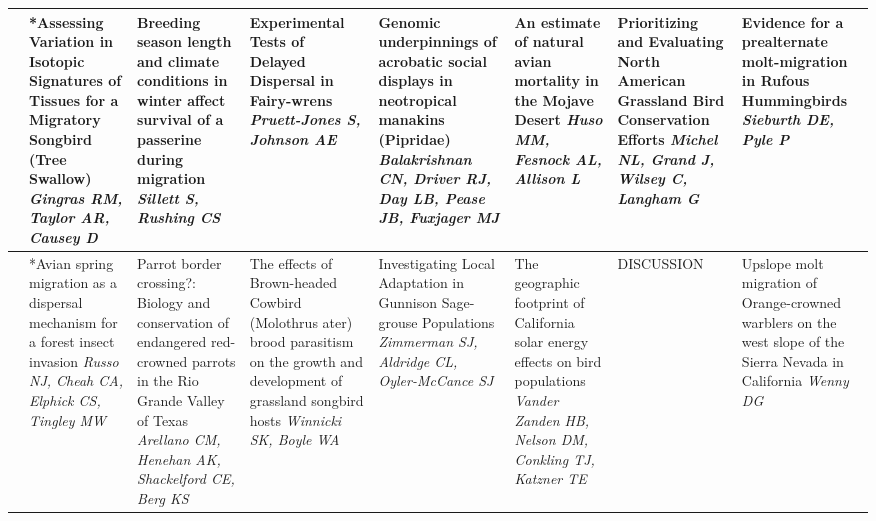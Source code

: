 \begin{tabular}{|x{0.85cm}|a{2.85cm}|x{2.85cm}|x{2.85cm}|x{2.85cm}|a{2.85cm}|a{2.85cm}|a{2.85cm}|}
&*Assessing Variation in Isotopic Signatures of Tissues for a Migratory Songbird (Tree Swallow) \newline \newline \textit{Gingras RM, Taylor AR, Causey D} & Breeding season length and climate conditions in winter affect survival of a passerine during migration \newline \newline \textit{Sillett S, Rushing CS} & Experimental Tests of Delayed Dispersal in Fairy-wrens \newline \newline \textit{Pruett-Jones S, Johnson AE} & Genomic underpinnings of acrobatic social displays in neotropical manakins (Pipridae) \newline \newline \textit{Balakrishnan CN, Driver RJ, Day LB, Pease JB, Fuxjager MJ} & An estimate of natural avian mortality in the Mojave Desert \newline \newline \textit{Huso MM, Fesnock AL, Allison L} & Prioritizing and Evaluating North American Grassland Bird Conservation Efforts \newline \newline \textit{Michel NL, Grand J, Wilsey C, Langham G} & Evidence for a prealternate molt-migration in Rufous Hummingbirds \newline \newline \textit{Sieburth DE, Pyle P}\\
\hline
{}&*Avian spring migration as a dispersal mechanism for a forest insect invasion \newline \newline \textit{Russo NJ, Cheah CA, Elphick CS, Tingley MW} & Parrot border crossing?: Biology and conservation of endangered red-crowned parrots in the Rio Grande Valley of Texas \newline \newline \textit{Arellano CM, Henehan AK, Shackelford CE, Berg KS} & The effects of Brown-headed Cowbird (Molothrus ater) brood parasitism on the growth and development of grassland songbird hosts \newline \newline \textit{Winnicki SK, Boyle WA} & Investigating Local Adaptation in Gunnison Sage-grouse Populations \newline \newline \textit{Zimmerman SJ, Aldridge CL, Oyler-McCance SJ} & The geographic footprint of California solar energy effects on bird populations \newline \newline \textit{Vander Zanden HB, Nelson DM, Conkling TJ, Katzner TE} & DISCUSSION \newline \newline \textit{} & Upslope molt migration of Orange-crowned warblers on the west slope of the Sierra Nevada in California \newline \newline \textit{Wenny DG}\\

\end{tabular}
